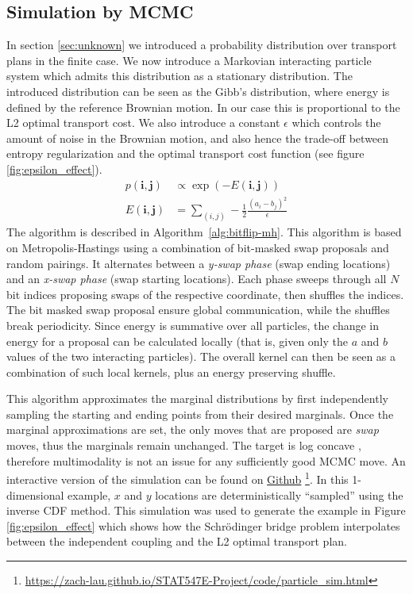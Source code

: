 \documentclass{article}
\begin{document}
\subsection{Simulation by MCMC}
In section \ref{sec:unknown} we introduced a probability distribution
over transport plans in the finite case. We now introduce a
Markovian interacting particle system which admits this distribution as
a stationary distribution. The introduced distribution can be seen as the
Gibb's distribution, where energy is defined by the reference Brownian motion.
In our case this is proportional to the L2 optimal transport cost. We also
introduce a constant $\epsilon$ which controls the amount of noise in the
Brownian motion, and also hence the trade-off between entropy regularization
and the optimal transport cost function (see figure \ref{fig:epsilon_effect}).
\begin{align}
    p(\mathbf i, \mathbf j) &\propto \exp(-E(\mathbf i, \mathbf j)) \\
    E(\mathbf i, \mathbf j) &= \sum_{(i,j)} -\frac 1 2 \frac{(a_i - b_j)^2}{\epsilon}
\end{align}
The algorithm is described in Algorithm~\ref{alg:bitflip-mh}.
This algorithm is based on Metropolis-Hastings using a combination of
bit-masked swap proposals and random pairings. It alternates between a
\emph{y-swap phase} (swap ending locations) and an \emph{x-swap phase}
(swap starting locations). Each phase sweeps through all $N$ bit indices
proposing swaps of the respective coordinate, then shuffles the indices. The bit
masked swap proposal ensure global communication, while the shuffles break
periodicity. Since energy is summative over all particles, the change in energy
for a proposal can be calculated locally (that is, given only the $a$ and $b$
values of the two interacting particles). The overall kernel can then be seen as
a combination of such local kernels, plus an energy preserving shuffle.

This algorithm approximates the marginal distributions by first independently
sampling the starting and ending points from their desired marginals. Once the
marginal approximations are set, the only moves that are proposed are 
\emph{swap} moves, thus the marginals remain unchanged.  The target is log concave
\cite{léonard2013surveyschrodingerproblemconnections}, therefore multimodality
is not an issue for any sufficiently good MCMC move. An interactive version of the simulation can be
found on
\href{https://zach-lau.github.io/STAT547E-Project/code/particle_sim.html}{Github}
\footnote{\url{https://zach-lau.github.io/STAT547E-Project/code/particle_sim.html}}.
In this 1-dimensional example, $x$ and $y$ locations are deterministically
``sampled'' using the inverse CDF method. This simulation was used to generate
the example in Figure \ref{fig:epsilon_effect} which shows how the Schrödinger
bridge problem interpolates between the independent coupling and the L2
optimal transport plan.
\end{document}
